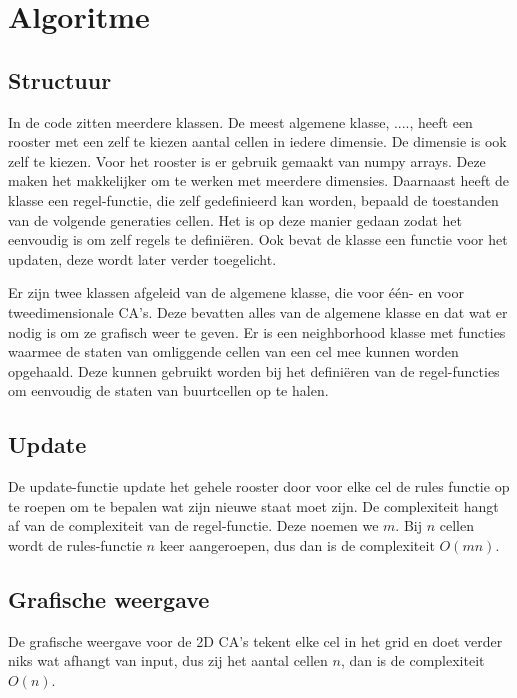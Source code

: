 \documentclass{article}
\begin{document}
\section{Algoritme}


\subsection{Structuur} %
In de code zitten meerdere klassen. De meest algemene klasse, ...., heeft een rooster met een zelf te kiezen aantal cellen in iedere dimensie. De dimensie is ook zelf te kiezen. Voor het rooster is er gebruik gemaakt van numpy arrays. Deze maken het makkelijker om te werken met meerdere dimensies. \newline
Daarnaast heeft de klasse een regel-functie, die zelf gedefinieerd kan worden, bepaald de toestanden van de volgende generaties cellen. Het is op deze manier gedaan zodat het eenvoudig is om zelf regels te definiëren. \newline Ook bevat de klasse een functie voor het updaten, deze wordt later verder toegelicht.

Er zijn twee klassen afgeleid van de algemene klasse, die voor één- en voor tweedimensionale CA's. Deze bevatten alles van de algemene klasse en dat wat er nodig is om ze grafisch weer te geven. Er is een neighborhood klasse met functies waarmee de staten van omliggende cellen van een cel mee kunnen worden opgehaald. Deze kunnen gebruikt worden bij het definiëren van de regel-functies om eenvoudig de staten van buurtcellen op te halen. 

\subsection{Update}
De update-functie update het gehele rooster door voor elke cel de rules functie op te roepen om te bepalen wat zijn nieuwe staat moet zijn. De complexiteit hangt af van de complexiteit van de regel-functie. Deze noemen we $m$. Bij $n$ cellen wordt de rules-functie $n$ keer aangeroepen, dus dan is de complexiteit $O(mn)$.

\subsection{Grafische weergave}
De grafische weergave voor de 2D CA's tekent elke cel in het grid en doet verder niks wat afhangt van input, dus zij het aantal cellen $n$, dan is de complexiteit $O(n)$.
\end{document}
